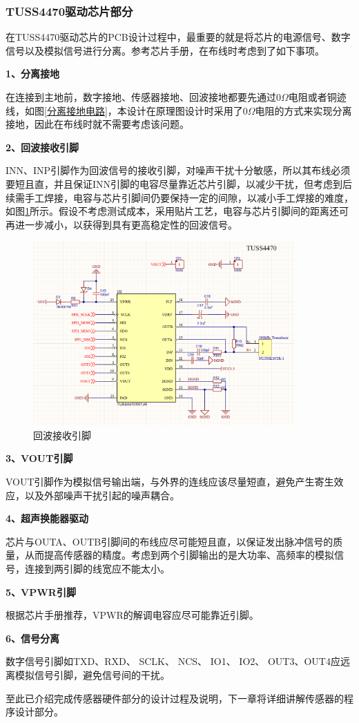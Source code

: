     
    \subsubsection{TUSS4470驱动芯片部分}
    在TUSS4470驱动芯片的PCB设计过程中，最重要的就是将芯片的电源信号、数字信号以及模拟信号进行分离。参考芯片手册，在布线时考虑到了如下事项。\par
    \noindent
    \textbf{1、分离接地}\par
    在连接到主地前，数字接地、传感器接地、回波接地都要先通过0$\Omega$电阻或者铜迹线，如图\ref{分离接地电路}，本设计在原理图设计时采用了0$\Omega$电阻的方式来实现分离接地，因此在布线时就不需要考虑该问题。
         
     \noindent
    \textbf{2、回波接收引脚}\par
    INN、INP引脚作为回波信号的接收引脚，对噪声干扰十分敏感，所以其布线必须要短且直，并且保证INN引脚的电容尽量靠近芯片引脚，以减少干扰，但考虑到后续需手工焊接，电容与芯片引脚间仍要保持一定的间隙，以减小手工焊接的难度，如图\ref{回波接收引脚}所示。假设不考虑测试成本，采用贴片工艺，电容与芯片引脚间的距离还可再进一步减小，以获得到具有更高稳定性的回波信号。
              \begin{figure}[H]
        \centering
        \includegraphics[width=10cm]{figure/TUSS4470 peripheral circuit.png}
        \songti{}\caption{回波接收引脚}
        \label{回波接收引脚}
    \end{figure}
     \noindent
    \textbf{3、VOUT引脚}\par
    VOUT引脚作为模拟信号输出端，与外界的连线应该尽量短直，避免产生寄生效应，以及外部噪声干扰引起的噪声耦合。\par
     \noindent
    \textbf{4、超声换能器驱动}\par
    芯片与OUTA、OUTB引脚间的布线应尽可能短且直，以保证发出脉冲信号的质量，从而提高传感器的精度。考虑到两个引脚输出的是大功率、高频率的模拟信号，连接到两引脚的线宽应不能太小。\par
    \noindent
     \textbf{5、VPWR引脚}\par
        根据芯片手册推荐，VPWR的解调电容应尽可能靠近引脚。\par
     \noindent
    \textbf{6、信号分离}\par
     数字信号引脚如TXD、RXD、 SCLK、 NCS、 
IO1、 IO2、 OUT3、OUT4应远离模拟信号引脚，避免信号间的干扰。\par
至此已介绍完成传感器硬件部分的设计过程及说明，下一章将详细讲解传感器的程序设计部分。

      
    
    
    